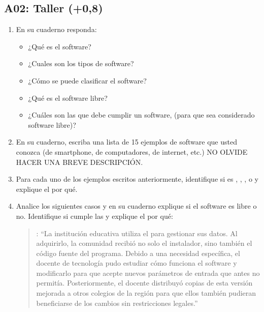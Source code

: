 \documentclass[letterpaper,10pt,spanish]{sphinxmanual}
\begin{document}
\subsection{A02: Taller (+0,8)}
\label{\detokenize{1_guias/10ofimatica/G1012:a02-taller-0-8}}
\sphinxAtStartPar
{}
\begin{enumerate}
%
\item {} 
\sphinxAtStartPar
En su cuaderno responda:
\begin{itemize}
\item {} 
\sphinxAtStartPar
¿Qué es el software?

\item {} 
\sphinxAtStartPar
¿Cuales son los tipos de software?

\item {} 
\sphinxAtStartPar
¿Cómo se puede clasificar el software?

\item {} 
\sphinxAtStartPar
¿Qué es el software libre?

\item {} 
\sphinxAtStartPar
¿Cuáles son las  que debe cumplir un software, (para que sea considerado software libre)?

\end{itemize}

\item {} 
\sphinxAtStartPar
En su cuaderno, escriba una lista de 15 ejemplos de software que usted conozca (de smartphone, de computadores, de internet, etc.) NO OLVIDE HACER UNA BREVE DESCRIPCIÓN.

\item {} 
\sphinxAtStartPar
Para cada uno de los ejemplos escritos anteriormente, identifique si es , , ,  o  y explique el por qué.

\item {} 
\sphinxAtStartPar
Analice los siguientes casos y en su cuaderno explique si el software es libre o no. Identifique si cumple las  y explique el por qué:
\begin{quote}

\sphinxAtStartPar
{}: “La institución educativa utiliza el  para gestionar sus datos. Al adquirirlo, la comunidad recibió no solo el instalador, sino también el código fuente del programa. Debido a una necesidad específica, el docente de tecnología pudo estudiar cómo funciona el software y modificarlo para que acepte nuevos parámetros de entrada que antes no permitía. Posteriormente, el docente distribuyó copias de esta versión mejorada a otros colegios de la región para que ellos también pudieran beneficiarse de los cambios sin restricciones legales.”
\end{quote}
\begin{quote}


\end{quote}
\end{enumerate}
\end{document}
